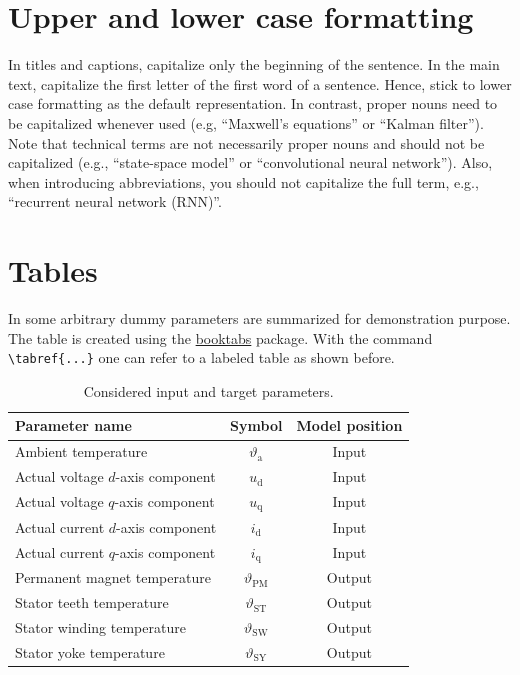 \section{Upper and lower case formatting}
\label{sec:formatting}
 In titles and captions, capitalize only the beginning of the sentence. In the main text, capitalize the first letter of the first word of a sentence. Hence, stick to lower case formatting as the default representation. In contrast, proper nouns need to be capitalized whenever used (e.g, \enquote{Maxwell's equations} or \enquote{Kalman filter}). Note that technical terms are not necessarily proper nouns and should not be capitalized (e.g., \enquote{state-space model} or \enquote{convolutional neural network}). Also, when introducing abbreviations, you should not capitalize the full term, e.g., \enquote{recurrent neural network (RNN)}.

\section{Tables}
\label{sec:features}
In  some arbitrary dummy parameters are summarized for demonstration purpose. The table is created using the \href{https://ctan.org/pkg/booktabs}{booktabs} package. With the command \verb|\tabref{...}| one can refer to a labeled table as shown before.  
\begin{table}[htb]
	\caption{Considered input and target parameters.}
	\label{tab:params}
	\centering
	\begin{tabular}{l c c}
		\toprule
		Parameter name & Symbol & Model position \\
		\midrule
		Ambient temperature & $\vartheta_\mathrm{a}$ & Input \\
		Actual voltage $d$-axis component & $u_\mathrm{d}$ & Input \\
		Actual voltage $q$-axis component & $u_\mathrm{q}$ & Input \\
		Actual current $d$-axis component & $i_\mathrm{d}$ & Input \\
		Actual current $q$-axis component & $i_\mathrm{q}$ & Input \\
		\hline
		Permanent magnet temperature & $\vartheta_{\mathrm{PM}}$ & Output \\
		Stator teeth temperature & $\vartheta_{\mathrm{ST}}$ & Output \\
		Stator winding temperature & $\vartheta_{\mathrm{SW}}$ & Output \\
		Stator yoke temperature & $\vartheta_{\mathrm{SY}}$ & Output\\
		\bottomrule
	 \end{tabular}
\end{table}


